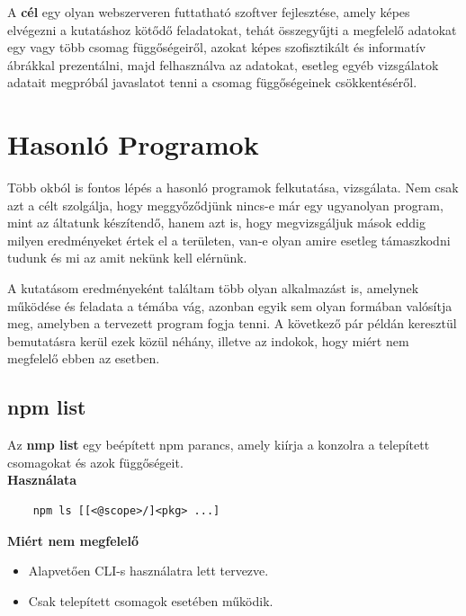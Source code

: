 	A \textbf{cél} egy olyan webszerveren futtatható szoftver fejlesztése, amely képes elvégezni a kutatáshoz kötődő feladatokat, tehát összegyűjti a megfelelő adatokat egy vagy több csomag függőségeiről, azokat képes szofisztikált és informatív ábrákkal prezentálni, majd felhasználva az adatokat, esetleg egyéb vizsgálatok adatait megpróbál javaslatot tenni a csomag függőségeinek csökkentéséről.

\section{Hasonló Programok}

Több okból is fontos lépés a hasonló programok felkutatása, vizsgálata. Nem csak azt a célt szolgálja, hogy meggyőződjünk nincs-e már egy ugyanolyan program, mint az áltatunk készítendő, hanem azt is, hogy megvizsgáljuk mások eddig milyen eredményeket értek el a területen, van-e olyan amire esetleg támaszkodni tudunk és mi az amit nekünk kell elérnünk.

A kutatásom eredményeként találtam több olyan alkalmazást is, amelynek működése és feladata a témába vág, azonban egyik sem olyan formában valósítja meg, amelyben a tervezett program fogja tenni. A következő pár példán keresztül bemutatásra kerül ezek közül néhány, illetve az indokok, hogy miért nem megfelelő ebben az esetben.

	\subsection{npm list}
	
	Az \textbf{nmp list} egy beépített npm parancs, amely kiírja a konzolra a telepített csomagokat és azok függőségeit.\\
	
	\textbf{Használata}
	\begin{verbatim}
	npm ls [[<@scope>/]<pkg> ...]
	\end{verbatim}
	
	\textbf{Miért nem megfelelő}
	\begin{itemize}
		\item Alapvetően CLI-s használatra lett tervezve.
		\item Csak telepített csomagok esetében működik.
	\end{itemize}
	
	\begin{flushright}
		\cite{dep-cruise}
	\end{flushright}
	
